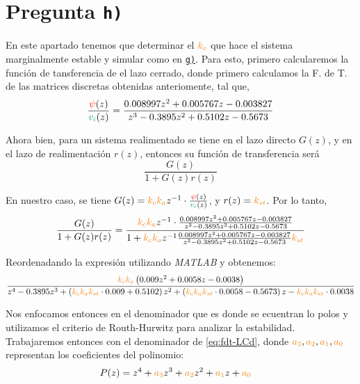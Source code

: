 \section{Pregunta \texttt{h)}}\label{pregunta-h}


En este apartado tenemos que determinar el $\nara{k_c}$  que hace el sistema
marginalmente estable y simular como en \hyperref[pregunta-g]{\texttt{g)}}. Para
esto, primero calcularemos la función de tansferencia de el lazo cerrado, donde
primero calculamos la F. de T. de las matrices discretas obtenidas
anteriomente, tal que,
\begin{equation}
   \frac{\rojo{\psi}(z)}{\verd{v_{i}}(z)} = \frac{0.008997z^2 + 0.005767 z - 0.003827}
    {z^3 - 0.3895 z^2 + 0.5102 z -0.5673}
\end{equation}

Ahora bien, para un sistema realimentado se tiene en el lazo directo $G(z)$, y 
en el lazo de realimentación $r(z)$, entonces su función de transferencia será
\begin{equation}
    \frac{G(z)}{1 + G(z)r(z)}
\end{equation}

En nuestro caso, se tiene $G(z) = \nara{k_{c} k_{a}} z^{-1} \cdot \frac{\rojo{\psi}(z)}{\verd{v_i}(z)}$,
y $r(z) = \nara{k_{st}}$. Por lo tanto,
\begin{equation}
    \frac{G(z)}{1 + G(z)r(z)} = \dfrac{\nara{k_ck_a} z^{-1} \cdot\frac{0.008997z^2 + 0.005767 z - 0.003827}
    {z^3 - 0.3895 z^2 + 0.5102 z -0.5673}}
    {1+\nara{k_ck_a} z^{-1} \frac{0.008997z^2 + 0.005767 z - 0.003827}
    {z^3 - 0.3895 z^2 + 0.5102 z -0.5673}\nara{k_{st}}}
\end{equation}

Reordenadando la expresión utilizando \textit{MATLAB} y obtenemos:
\begin{equation}\label{eq:fdt-LCd}
        \frac{ \nara{k_c k_a} \left( 0.009 z^2 + 0.0058 z - 0.0038 \right)}
        { z^4 -0.3895z^3 + \left( \nara{k_c k_a k_{st}} \cdot 0.009 + 0.5102
        \right) z^2 
        + \left( \nara{k_c k_a k_{st}} \cdot0.0058 -0.5673 \right) z 
        - \nara{k_c k_a k_{st}} \cdot 0.0038 }
\end{equation}

Nos enfocamos entonces en el denominador que es donde se ecuentran lo polos y
utilizamos el criterio de Routh-Hurwitz para analizar la estabilidad. 
Trabajaremos entonces con el denominador de \eqref{eq:fdt-LCd}, donde $\nara{a_3},\nara{a_2},\nara{a_1},\nara{a_0}$
representan los coeficientes del polinomio:
\begin{align}
    P(z) = z^4 +\nara{a_3}z^3 + \nara{a_2} z^2 + \nara{a_1} z + \nara{a_0} &
\end{align}

